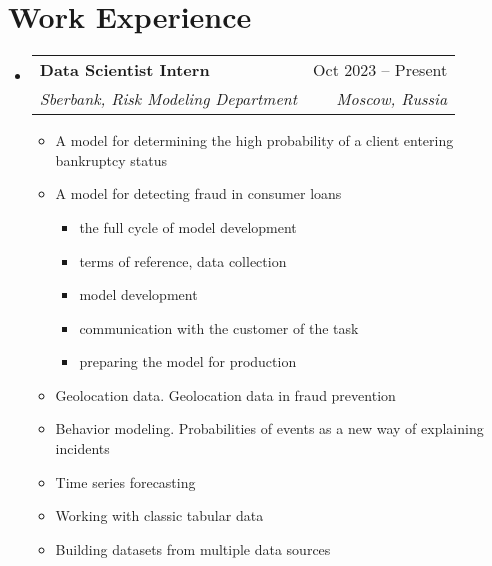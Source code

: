 \documentclass[a4paper,11pt]{article}
\makeatletter
\newcommand{\resumeItem}[1]{
  \item\small{#1}
}
\newcommand{\resumeItemListStart}{\begin{itemize}[rightmargin=0.11in]}
\newcommand{\resumeItemListEnd}{\end{itemize}}
\newcommand{\resumeQuadHeading}[4]{
  \item
  \begin{tabular*}{0.96\textwidth}[t]{l@{\extracolsep{\fill}}r}
    \textbf{#1} & #2 \\
    \textit{\small#3} & \textit{\small #4} \\
  \end{tabular*}
}
\newcommand{\resumeHeadingListStart}{
  \begin{itemize}[leftmargin=0.15in, label={}]
}
\newcommand{\resumeHeadingListEnd}{\end{itemize}}
\makeatother
\begin{document}
\section{Work Experience}
\resumeHeadingListStart{}
  \resumeQuadHeading{Data Scientist Intern}{Oct 2023 -- Present}
  {Sberbank, Risk Modeling Department}{Moscow, Russia}
    \resumeItemListStart
      \resumeItem{
        A model for determining the high probability of a client entering bankruptcy status
      }
      \resumeItem{
        A model for detecting fraud in consumer loans
        \begin{itemize}
          \item the full cycle of model development
          \item terms of reference, data collection
          \item model development
          \item communication with the customer of the task
          \item preparing the model for production
        \end{itemize}  
      }
      \resumeItem{Geolocation data. Geolocation data in fraud prevention}
      \resumeItem{Behavior modeling. Probabilities of events as a new way of explaining incidents}
      \resumeItem{Time series forecasting}
      \resumeItem{Working with classic tabular data}
      \resumeItem{Building datasets from multiple data sources}
      \resumeItemListEnd


\resumeHeadingListEnd{}


\end{document}

